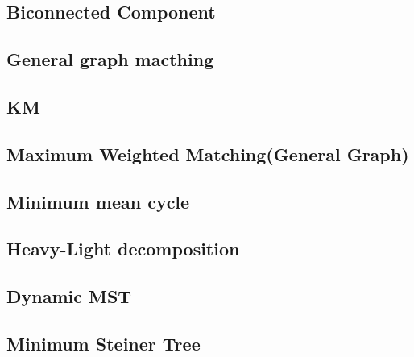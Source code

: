 \documentclass[a4paper,10pt,twocolumn,oneside]{article}
\begin{document}
\subsection{Biconnected Component}


\subsection{General graph macthing}


%

\subsection{KM}


\subsection{Maximum Weighted Matching(General Graph)}


%

\subsection{Minimum mean cycle}


\subsection{Heavy-Light decomposition}


\subsection{Dynamic MST}


\subsection{Minimum Steiner Tree}

\end{document}
